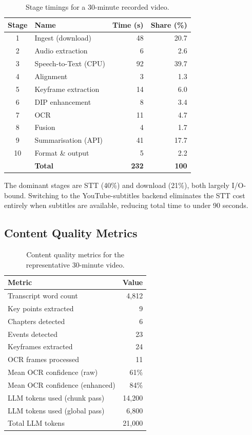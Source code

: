 \documentclass[12pt,a4paper]{article}
\begin{document}
\begin{table}[H]
\centering
\caption{Stage timings for a 30-minute recorded video.}
\label{tab:timing}
\begin{tabular}{@{}clrr@{}}
\toprule
\textbf{Stage} & \textbf{Name} & \textbf{Time (s)} & \textbf{Share (\%)} \\
\midrule
1  & Ingest (download)      & 48  & 20.7 \\
2  & Audio extraction       &  6  &  2.6 \\
3  & Speech-to-Text (CPU)   & 92  & 39.7 \\
4  & Alignment              &  3  &  1.3 \\
5  & Keyframe extraction    & 14  &  6.0 \\
6  & DIP enhancement        &  8  &  3.4 \\
7  & OCR                    & 11  &  4.7 \\
8  & Fusion                 &  4  &  1.7 \\
9  & Summarisation (API)    & 41  & 17.7 \\
10 & Format \& output       &  5  &  2.2 \\
\midrule
   & \textbf{Total}         & \textbf{232} & \textbf{100} \\
\bottomrule
\end{tabular}
\end{table}

The dominant stages are STT (40\%) and download (21\%), both largely I/O-bound.
Switching to the YouTube-subtitles backend eliminates the STT cost entirely when
subtitles are available, reducing total time to under 90 seconds.

\subsection{Content Quality Metrics}

\begin{table}[H]
\centering
\caption{Content quality metrics for the representative 30-minute video.}
\label{tab:quality}
\begin{tabular}{@{}lr@{}}
\toprule
\textbf{Metric} & \textbf{Value} \\
\midrule
Transcript word count           & 4,812 \\
Key points extracted            & 9 \\
Chapters detected               & 6 \\
Events detected                 & 23 \\
Keyframes extracted             & 24 \\
OCR frames processed            & 11 \\
Mean OCR confidence (raw)       & 61\% \\
Mean OCR confidence (enhanced)  & 84\% \\
LLM tokens used (chunk pass)    & 14,200 \\
LLM tokens used (global pass)   & 6,800 \\
Total LLM tokens                & 21,000 \\
\bottomrule
\end{tabular}
\end{table}
\end{document}
